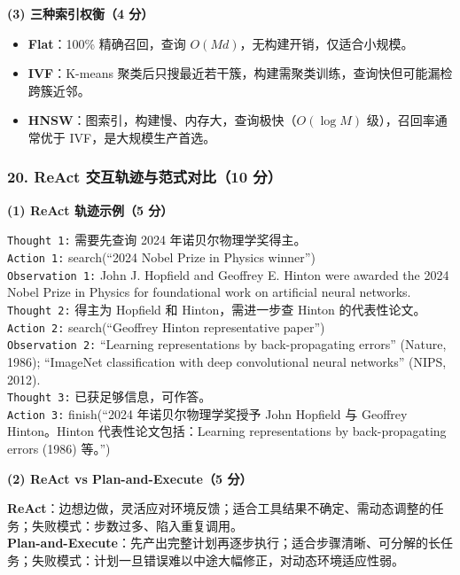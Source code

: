 \documentclass[11pt,a4paper]{article}
\begin{document}
\noindent\textbf{(3) 三种索引权衡（4 分）}

\begin{itemize}[leftmargin=2em,itemsep=0pt,parsep=0pt,topsep=0pt]
  \item \textbf{Flat}：100\% 精确召回，查询 $O(Md)$，无构建开销，仅适合小规模。
  \item \textbf{IVF}：K-means 聚类后只搜最近若干簇，构建需聚类训练，查询快但可能漏检跨簇近邻。
  \item \textbf{HNSW}：图索引，构建慢、内存大，查询极快（$O(\log M)$ 级），召回率通常优于 IVF，是大规模生产首选。
\end{itemize}

\subsubsection*{20. ReAct 交互轨迹与范式对比（10 分）}

\noindent\textbf{(1) ReAct 轨迹示例（5 分）}

\texttt{Thought 1:} 需要先查询 2024 年诺贝尔物理学奖得主。\\
\texttt{Action 1:} search(``2024 Nobel Prize in Physics winner'')\\
\texttt{Observation 1:} John J. Hopfield and Geoffrey E. Hinton were awarded the 2024 Nobel Prize in Physics for foundational work on artificial neural networks.\\
\texttt{Thought 2:} 得主为 Hopfield 和 Hinton，需进一步查 Hinton 的代表性论文。\\
\texttt{Action 2:} search(``Geoffrey Hinton representative paper'')\\
\texttt{Observation 2:} ``Learning representations by back-propagating errors'' (Nature, 1986); ``ImageNet classification with deep convolutional neural networks'' (NIPS, 2012).\\
\texttt{Thought 3:} 已获足够信息，可作答。\\
\texttt{Action 3:} finish(``2024 年诺贝尔物理学奖授予 John Hopfield 与 Geoffrey Hinton。Hinton 代表性论文包括：Learning representations by back-propagating errors (1986) 等。'')

\noindent\textbf{(2) ReAct vs Plan-and-Execute（5 分）}

\textbf{ReAct}：边想边做，灵活应对环境反馈；适合工具结果不确定、需动态调整的任务；失败模式：步数过多、陷入重复调用。\\
\textbf{Plan-and-Execute}：先产出完整计划再逐步执行；适合步骤清晰、可分解的长任务；失败模式：计划一旦错误难以中途大幅修正，对动态环境适应性弱。
\end{document}
